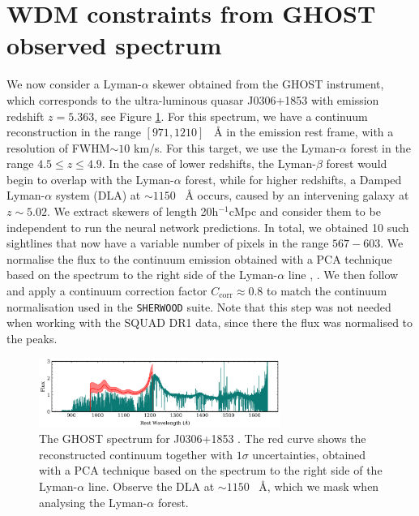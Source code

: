 \section{WDM constraints from GHOST observed spectrum}\label{sec:inference ghost}
We now consider a Lyman-$\alpha$ skewer obtained from the GHOST instrument, which corresponds to the ultra-luminous quasar J0306+1853 \cite{Wang_2015} with emission redshift $z=5.363$, see Figure \ref{fig: ghost spectrum}. For this spectrum, we have a continuum reconstruction in the range $[971, 1210]$ \textup{~\AA} in the emission rest frame, with a resolution of FWHM$\sim 10$ km/s.
For this target, we use the Lyman-$\alpha$ forest in the range $4.5\leq z \leq 4.9$. In the case of lower redshifts, the Lyman-$\beta$ forest would begin to overlap with the Lyman-$\alpha$ forest, while for higher redshifts, a Damped Lyman-$\alpha$ system (DLA) at $\sim 1150$ \textup{~\AA} occurs, caused by an intervening galaxy at $z\sim 5.02$.
We extract skewers of length 20h$^{-1}$cMpc and consider them to be independent to run the neural network predictions. In total, we obtained 10 such sightlines that now have a variable number of pixels in the range $567-603$. We normalise the flux to the continuum emission obtained with a PCA technique based on the spectrum to the right side of the Lyman-$\alpha$ line \cite{Bosman2021_pca}, \cite{Davies2018_PCA}. We then follow \cite{Bolton_2016} and apply a continuum correction factor $C_\mathrm{corr}\approx 0.8$ to match the continuum normalisation used in the \texttt{SHERWOOD} suite. Note that this step was not needed when working with the SQUAD DR1 data, since there the flux was normalised to the peaks.


\begin{figure}
    \centering
    \includegraphics[width=0.7\textwidth]{img/ML/ghost_spectrum.png}
    \caption{The GHOST spectrum for J0306+1853 \cite{Wang_2015}. The red curve shows the reconstructed continuum together with $1\sigma$ uncertainties, obtained with a PCA technique based on the spectrum to the right side of the Lyman-$\alpha$ line. Observe the DLA at $\sim 1150$ \textup{~\AA}, which we mask when analysing the Lyman-$\alpha$ forest. }
    \label{fig: ghost spectrum}
\end{figure}

